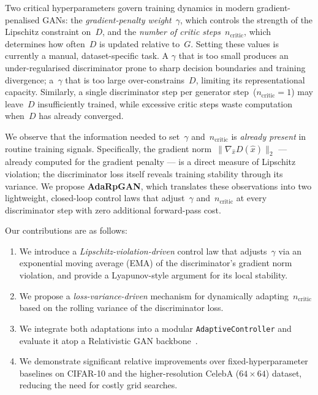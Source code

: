 \documentclass{article}
\newcommand{\ncritic}{n_{\mathrm{critic}}}
\begin{document}
Two critical hyperparameters govern training dynamics in modern gradient-penalised GANs: the \emph{gradient-penalty weight}~$\gamma$, which controls the strength of the Lipschitz constraint on~$D$, and the \emph{number of critic steps}~$\ncritic$, which determines how often~$D$ is updated relative to~$G$. Setting these values is currently a manual, dataset-specific task. A $\gamma$ that is too small produces an under-regularised discriminator prone to sharp decision boundaries and training divergence; a~$\gamma$ that is too large over-constrains~$D$, limiting its representational capacity. Similarly, a single discriminator step per generator step~($\ncritic\!=\!1$) may leave~$D$ insufficiently trained, while excessive critic steps waste computation when~$D$ has already converged.

We observe that the information needed to set~$\gamma$ and~$\ncritic$ is \emph{already present} in routine training signals. Specifically, the gradient norm~$\|\nabla_{\hat{x}} D(\hat{x})\|_2$ --- already computed for the gradient penalty --- is a direct measure of Lipschitz violation; the discriminator loss itself reveals training stability through its variance. We propose \textbf{AdaRpGAN}, which translates these observations into two lightweight, closed-loop control laws that adjust~$\gamma$ and~$\ncritic$ at every discriminator step with zero additional forward-pass cost.

Our contributions are as follows:
\begin{enumerate}
    \item We introduce a \emph{Lipschitz-violation-driven} control law that adjusts~$\gamma$ via an exponential moving average (EMA) of the discriminator's gradient norm violation, and provide a Lyapunov-style argument for its local stability.
    \item We propose a \emph{loss-variance-driven} mechanism for dynamically adapting~$\ncritic$ based on the rolling variance of the discriminator loss.
    \item We integrate both adaptations into a modular \texttt{AdaptiveController} and evaluate it atop a Relativistic GAN backbone~\cite{jolicoeur2019relativistic}.
    \item We demonstrate significant relative improvements over fixed-hyperparameter baselines on CIFAR-10 and the higher-resolution CelebA ($64{\times}64$) dataset, reducing the need for costly grid searches.
\end{enumerate}

\end{document}
